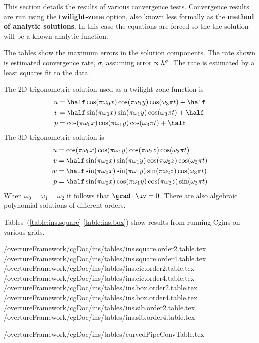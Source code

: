 \documentclass[10pt]{article}
\newcommand{\convDir}{\homeHenshaw/overtureFramework/cgDoc/ins/tables}
\begin{document}
This section details the results of various convergence tests. 
Convergence results are run using the {\bf twilight-zone} option, also
known less formally as the {\bf method of analytic solutions}.
In this case the equations are forced so the the solution will
be a known analytic function.

The tables show the maximum errors in the solution components. The rate shown is estimated convergence rate, $\sigma$,
assuming ${\rm error} \propto h^\sigma$. The rate is estimated by a least squares fit to the data.

The 2D trigonometric solution used as a twilight zone function is
\begin{align*}
    u &= \half \cos(\pi \omega_0 x) \cos(\pi \omega_1 y) \cos( \omega_3 \pi t) + \half\\
    v &= \half \sin(\pi \omega_0 x) \sin(\pi \omega_1 y) \cos( \omega_3 \pi t) + \half\\
    p &=       \cos(\pi \omega_0 x) \cos(\pi \omega_1 y) \cos( \omega_3 \pi t)  + \half
\end{align*}
The 3D trigonometric solution is
\begin{align*}
    u &=       \cos(\pi \omega_0 x) \cos(\pi \omega_1 y) \cos(\pi \omega_2 z) \cos( \omega_3 \pi t) \\
    v &= \half \sin(\pi \omega_0 x) \sin(\pi \omega_1 y) \cos(\pi \omega_2 z) \cos( \omega_3 \pi t) \\
    w &= \half \sin(\pi \omega_0 x) \sin(\pi \omega_1 y) \sin(\pi \omega_2 z) \cos( \omega_3 \pi t) \\
    p &= \half \sin(\pi \omega_0 x) \cos(\pi \omega_1 y) \cos(\pi \omega_2 z) \sin( \omega_3 \pi t) 
\end{align*}
When $\omega_0=\omega_1=\omega_2$ it follows that $\grad\cdot\uv=0$.
There are also algebraic polynomial solutions of different orders.


Tables~(\ref{table:ins.square}-\ref{table:ins.box}) show results from running Cgins on various
grids. 

 \convDir/ins.square.order2.table.tex
 \convDir/ins.square.order4.table.tex
 \convDir/ins.cic.order2.table.tex
 \convDir/ins.cic.order4.table.tex
 \convDir/ins.box.order2.table.tex
 \convDir/ins.box.order4.table.tex
 \convDir/ins.sib.order2.table.tex
 \convDir/ins.sib.order4.table.tex

 \convDir/curvedPipeConvTable.tex
\end{document}
